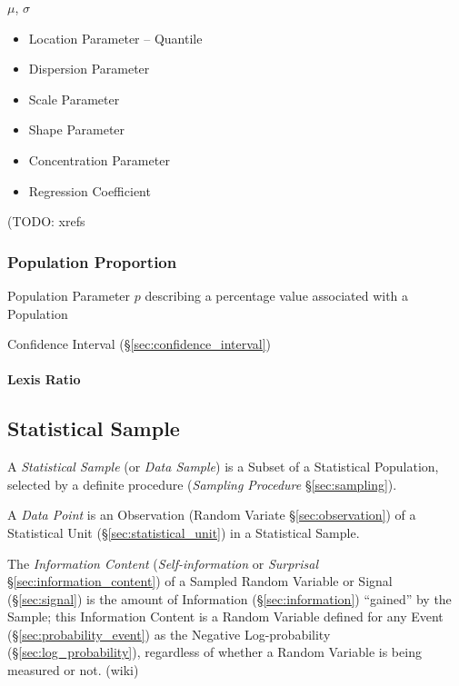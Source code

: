 $\mu$, $\sigma$

\begin{itemize}
  \item Location Parameter -- Quantile
  \item Dispersion Parameter
  \item Scale Parameter
  \item Shape Parameter
  \item Concentration Parameter
  \item Regression Coefficient
\end{itemize}
(TODO: xrefs



\subsubsection{Population Proportion}\label{sec:proportion}

Population Parameter $p$ describing a percentage value associated with a
Population

\fist Confidence Interval (\S\ref{sec:confidence_interval})



\paragraph{Lexis Ratio}\label{sec:lexis_ratio}\hfill



\subsection{Statistical Sample}\label{sec:sample}

A \emph{Statistical Sample} (or \emph{Data Sample}) is a Subset of a Statistical
Population, selected by a definite procedure (\emph{Sampling Procedure}
\S\ref{sec:sampling}).

A \emph{Data Point} is an Observation (Random Variate \S\ref{sec:observation})
of a Statistical Unit (\S\ref{sec:statistical_unit}) in a Statistical Sample.

The \emph{Information Content} (\emph{Self-information} or \emph{Surprisal}
\S\ref{sec:information_content}) of a Sampled Random Variable or Signal
(\S\ref{sec:signal}) is the amount of Information (\S\ref{sec:information})
``gained'' by the Sample; this Information Content is a Random Variable defined
for any Event (\S\ref{sec:probability_event}) as the Negative Log-probability
(\S\ref{sec:log_probability}), regardless of whether a Random Variable is being
measured or not. (wiki)

